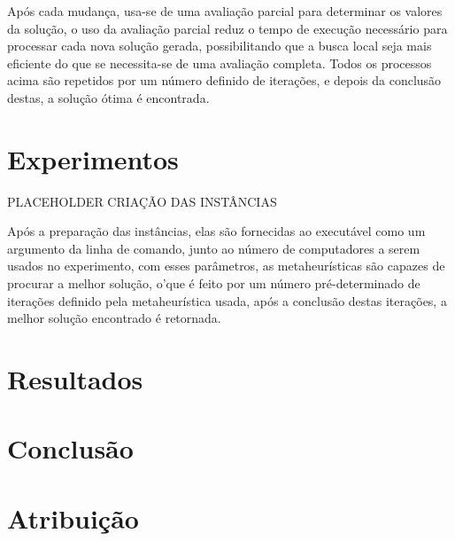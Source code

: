 \documentclass[12pt]{article}
\begin{document}
Após cada mudança, usa-se de uma avaliação parcial para determinar os valores da solução, o uso da avaliação parcial reduz o tempo de execução necessário para processar cada nova solução gerada, possibilitando que a busca local seja mais eficiente do que se necessita-se de uma avaliação completa. Todos os processos acima são repetidos por um número definido de iterações, e depois da conclusão destas, a solução ótima é encontrada.












\section{Experimentos}

PLACEHOLDER CRIAÇÃO DAS INSTÂNCIAS 

Após a preparação das instâncias, elas são fornecidas ao executável como um argumento da linha de comando, junto ao número de computadores a serem usados no experimento, com esses parâmetros, as metaheurísticas são capazes de procurar a melhor solução, o'que é feito por um número pré-determinado de iterações definido pela metaheurística usada, após a conclusão destas iterações,  a melhor solução encontrado é retornada.



\section{Resultados}


\section{Conclusão}


\section{Atribuição}
\end{document}

